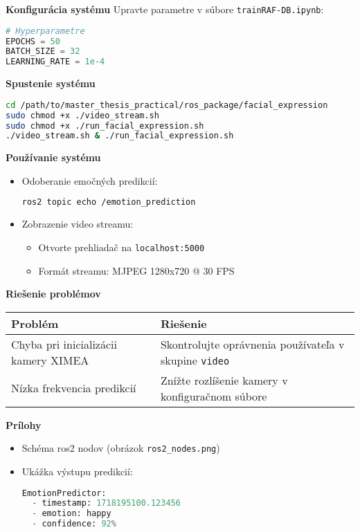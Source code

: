 \textbf{Konfigurácia systému}  
Upravte parametre v súbore \texttt{trainRAF-DB.ipynb}:
\begin{lstlisting}[language=Python]
# Hyperparametre
EPOCHS = 50
BATCH_SIZE = 32
LEARNING_RATE = 1e-4
\end{lstlisting}

\textbf{Spustenie systému}  
\begin{lstlisting}[language=bash]
cd /path/to/master_thesis_practical/ros_package/facial_expression
sudo chmod +x ./video_stream.sh
sudo chmod +x ./run_facial_expression.sh
./video_stream.sh & ./run_facial_expression.sh
\end{lstlisting}

\textbf{Používanie systému}  
\begin{itemize}
\item Odoberanie emočných predikcií:
\begin{lstlisting}[language=bash]
ros2 topic echo /emotion_prediction
\end{lstlisting}

\item Zobrazenie video streamu:
\begin{itemize}
\item Otvorte prehliadač na \texttt{localhost:5000}
\item Formát streamu: MJPEG 1280x720 @ 30 FPS
\end{itemize}
\end{itemize}

\textbf{Riešenie problémov}  

\begin{tabular}{|p{6cm}|p{9cm}|}
\hline
Problém & Riešenie \\
\hline
Chyba pri inicializácii kamery XIMEA & Skontrolujte oprávnenia používateľa v skupine \texttt{video} \\
Nízka frekvencia predikcií & Znížte rozlíšenie kamery v konfiguračnom súbore \\
\hline
\end{tabular}

\textbf{Prílohy}  
\begin{itemize}
\item Schéma \gls{ros}2 nodov (obrázok \texttt{ros2\_nodes.png})
\item Ukážka výstupu predikcií:
\begin{lstlisting}[language=Python]
EmotionPredictor:
  - timestamp: 1718195100.123456
  - emotion: happy
  - confidence: 92%
\end{lstlisting}
\end{itemize}

